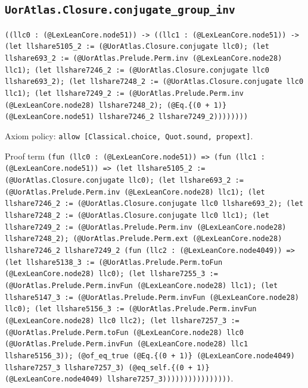 \documentclass[11pt]{article}
\begin{document}
\subsection*{\texttt{UorAtlas.Closure.conjugate\_group\_inv}}
\noindent\texttt{((llc0 : (@LexLeanCore.node51)) -> ((llc1 : (@LexLeanCore.node51)) -> (let llshare5105\_2 := (@UorAtlas.Closure.conjugate llc0); (let llshare693\_2 := (@UorAtlas.Prelude.Perm.inv (@LexLeanCore.node28) llc1); (let llshare7246\_2 := (@UorAtlas.Closure.conjugate llc0 llshare693\_2); (let llshare7248\_2 := (@UorAtlas.Closure.conjugate llc0 llc1); (let llshare7249\_2 := (@UorAtlas.Prelude.Perm.inv (@LexLeanCore.node28) llshare7248\_2); (@Eq.\{(0 + 1)\} (@LexLeanCore.node51) llshare7246\_2 llshare7249\_2))))))))}\par
\noindent Axiom policy: \texttt{allow [Classical.choice, Quot.sound, propext]}.\par
\noindent Proof term \texttt{(fun (llc0 : (@LexLeanCore.node51)) => (fun (llc1 : (@LexLeanCore.node51)) => (let llshare5105\_2 := (@UorAtlas.Closure.conjugate llc0); (let llshare693\_2 := (@UorAtlas.Prelude.Perm.inv (@LexLeanCore.node28) llc1); (let llshare7246\_2 := (@UorAtlas.Closure.conjugate llc0 llshare693\_2); (let llshare7248\_2 := (@UorAtlas.Closure.conjugate llc0 llc1); (let llshare7249\_2 := (@UorAtlas.Prelude.Perm.inv (@LexLeanCore.node28) llshare7248\_2); (@UorAtlas.Prelude.Perm.ext (@LexLeanCore.node28) llshare7246\_2 llshare7249\_2 (fun (llc2 : (@LexLeanCore.node4049)) => (let llshare5138\_3 := (@UorAtlas.Prelude.Perm.toFun (@LexLeanCore.node28) llc0); (let llshare7255\_3 := (@UorAtlas.Prelude.Perm.invFun (@LexLeanCore.node28) llc1); (let llshare5147\_3 := (@UorAtlas.Prelude.Perm.invFun (@LexLeanCore.node28) llc0); (let llshare5156\_3 := (@UorAtlas.Prelude.Perm.invFun (@LexLeanCore.node28) llc0 llc2); (let llshare7257\_3 := (@UorAtlas.Prelude.Perm.toFun (@LexLeanCore.node28) llc0 (@UorAtlas.Prelude.Perm.invFun (@LexLeanCore.node28) llc1 llshare5156\_3)); (@of\_eq\_true (@Eq.\{(0 + 1)\} (@LexLeanCore.node4049) llshare7257\_3 llshare7257\_3) (@eq\_self.\{(0 + 1)\} (@LexLeanCore.node4049) llshare7257\_3))))))))))))))))}.\par
\end{document}
